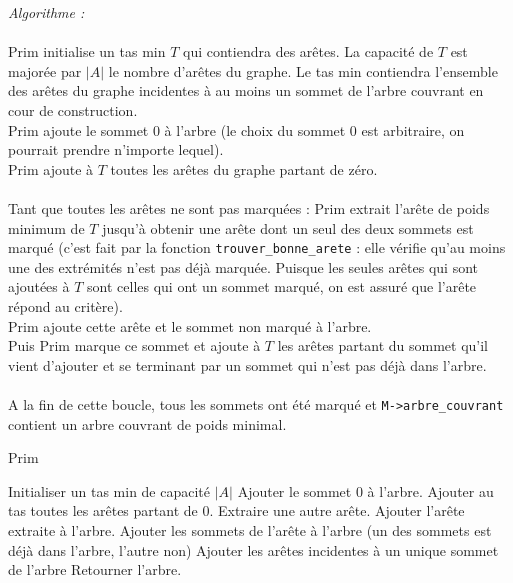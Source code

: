 \documentclass[a4paper,11pt]{article}
\begin{document}
\textit{Algorithme : } \\
\\
Prim initialise un tas min $T$ qui contiendra des arêtes. La capacité de $T$ est majorée par $|A|$ le nombre d'arêtes du graphe. Le tas min contiendra l'ensemble des arêtes du graphe incidentes à au moins un sommet de l'arbre couvrant en cour de construction.\\
Prim ajoute le sommet 0 à l'arbre (le choix du sommet 0 est arbitraire, on pourrait prendre n'importe lequel).\\
Prim ajoute à $T$ toutes les arêtes du graphe partant de zéro.\\
\\
Tant que toutes les arêtes ne sont pas marquées :
Prim extrait l'arête de poids minimum de $T$ jusqu'à obtenir une arête dont un seul des deux sommets est marqué (c'est fait par la fonction \texttt{trouver\_bonne\_arete} : elle vérifie qu'au moins une des extrémités n'est pas déjà marquée. Puisque les seules arêtes qui sont ajoutées à $T$ sont celles qui ont un sommet marqué, on est assuré que l'arête répond au critère).\\
Prim ajoute cette arête et le sommet non marqué à l'arbre.\\
Puis Prim marque ce sommet et ajoute à $T$ les arêtes partant du sommet qu'il vient d'ajouter et se terminant par un sommet qui n'est pas déjà dans l'arbre.\\
\\
A la fin de cette boucle, tous les sommets ont été marqué et \texttt{M->arbre\_couvrant} contient un arbre couvrant de poids minimal.\\

\begin{algorithm}
\caption{Prim}
\begin{algorithmic}[1]

\STATE Initialiser un tas min de capacité $|A|$
\STATE Ajouter le sommet 0 à l'arbre.
\STATE Ajouter au tas toutes les arêtes partant de 0.
\STATE Extraire une autre arête.
\ENDWHILE
\STATE Ajouter l'arête extraite à l'arbre.
\STATE Ajouter les sommets de l'arête à l'arbre (un des sommets est déjà dans l'arbre, l'autre non)
\STATE Ajouter les arêtes incidentes à un unique sommet de l'arbre
\ENDWHILE
\STATE Retourner l'arbre.

\end{algorithmic}
\end{algorithm}
\end{document}
